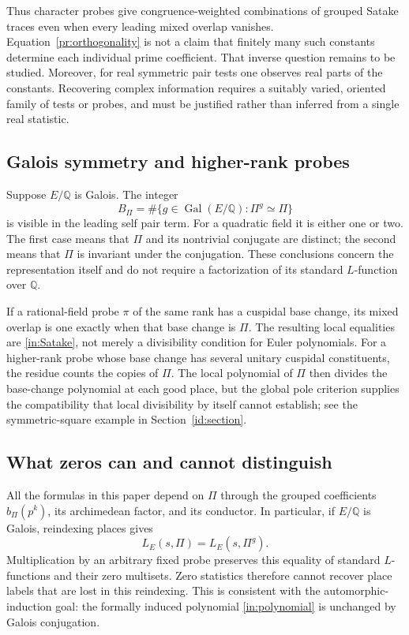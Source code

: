 \documentclass[11pt,reqno]{amsart}
\numberwithin{equation}{section}
\theoremstyle{definition}
\theoremstyle{remark}
\begin{document}
Thus character probes give congruence-weighted combinations of grouped Satake traces even when every leading mixed overlap vanishes. Equation~\eqref{pr:orthogonality} is not a claim that finitely many such constants determine each individual prime coefficient. That inverse question remains to be studied. Moreover, for real symmetric pair tests one observes real parts of the constants. Recovering complex information requires a suitably varied, oriented family of tests or probes, and must be justified rather than inferred from a single real statistic.

\subsection{Galois symmetry and higher-rank probes}
Suppose $E/\mathbb Q$ is Galois. The integer
\begin{equation}B_\Pi=\#\{g\in\operatorname{Gal}(E/\mathbb Q):\Pi^g\simeq\Pi\}\label{pr:stabilizer}\end{equation}
is visible in the leading self pair term. For a quadratic field it is either one or two. The first case means that $\Pi$ and its nontrivial conjugate are distinct; the second means that $\Pi$ is invariant under the conjugation. These conclusions concern the representation itself and do not require a factorization of its standard $L$-function over $\mathbb Q$.

If a rational-field probe $\pi$ of the same rank has a cuspidal base change, its mixed overlap is one exactly when that base change is $\Pi$. The resulting local equalities are \eqref{in:Satake}, not merely a divisibility condition for Euler polynomials. For a higher-rank probe whose base change has several unitary cuspidal constituents, the residue counts the copies of $\Pi$. The local polynomial of $\Pi$ then divides the base-change polynomial at each good place, but the global pole criterion supplies the compatibility that local divisibility by itself cannot establish; see the symmetric-square example in Section~\ref{id:section}.

\subsection{What zeros can and cannot distinguish}
All the formulas in this paper depend on $\Pi$ through the grouped coefficients $b_\Pi(p^k)$, its archimedean factor, and its conductor. In particular, if $E/\mathbb Q$ is Galois, reindexing places gives
\begin{equation}L_E(s,\Pi)=L_E(s,\Pi^g).\label{pr:conjugate-ambiguity}\end{equation}
Multiplication by an arbitrary fixed probe preserves this equality of standard $L$-functions and their zero multisets. Zero statistics therefore cannot recover place labels that are lost in this reindexing. This is consistent with the automorphic-induction goal: the formally induced polynomial \eqref{in:polynomial} is unchanged by Galois conjugation.
\end{document}
